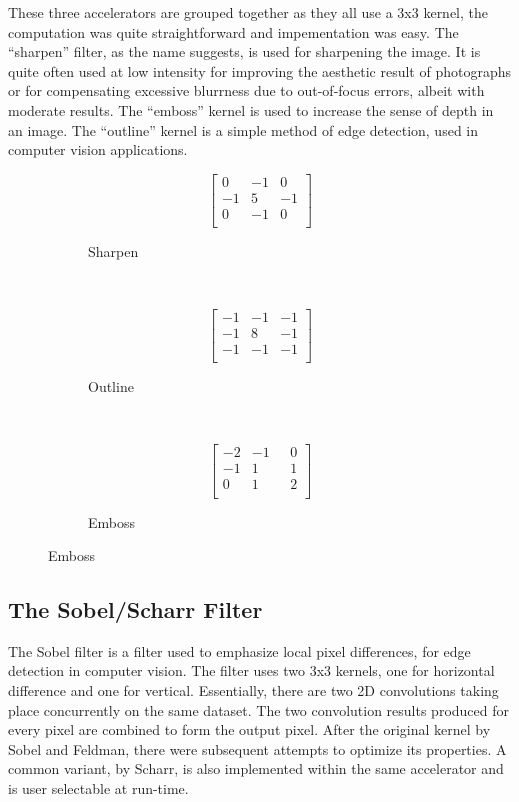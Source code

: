 These three accelerators are grouped together as they all use a 3x3 kernel,
the computation was quite straightforward and impementation was easy.
The ``sharpen'' filter, as the name suggests, is used for sharpening the image.
It is quite often used at low intensity for improving the aesthetic result of
photographs or for compensating excessive blurrness due to out-of-focus errors,
albeit with moderate results. 
The ``emboss'' kernel is used to increase the sense of depth in an image.
The ``outline'' kernel is a simple method
of edge detection, used in computer vision applications.


\begin{figure}[H]
\centering
\begin{subfigure}[b]{.3\linewidth}
	\[
	\left[
	\begin{array}{rrr}
	0  & -1  &  0 \\
	-1 &  5  & -1 \\
	0  & -1  &  0 \\
	\end{array}
	\right]
	\]
	\caption{Sharpen}
\end{subfigure}
~
\begin{subfigure}[b]{.3\linewidth}
	\[
	\left[
	\begin{array}{rrr}
	-1  & -1  & -1 \\
	-1  &  8  & -1 \\
	-1  & -1  & -1 \\
	\end{array}
	\right]
	\]
	\caption{Outline}
\end{subfigure}
~
\begin{subfigure}[b]{.3\linewidth}
	\[
	\left[
	\begin{array}{rrr}
	-2  & -1  &  ~~~0 \\
	-1  &  1  &  ~~~1 \\
	 0  &  1  &  ~~~2 \\
	\end{array}
	\right]
	\]
	\caption{Emboss}
\end{subfigure}
\end{figure}

\subsection{The Sobel/Scharr Filter}

The Sobel filter is a filter used to emphasize local pixel differences,
for edge detection in computer vision. The filter uses two 3x3 kernels,
one for horizontal difference and one for vertical. Essentially,
there are two 2D convolutions taking place concurrently on the same dataset.
The two convolution results produced for every pixel are combined to
form the output pixel. After the original kernel by Sobel and Feldman,
there were subsequent attempts to optimize its properties. A common variant,
by Scharr, is also implemented within the same accelerator and is user selectable at run-time.

